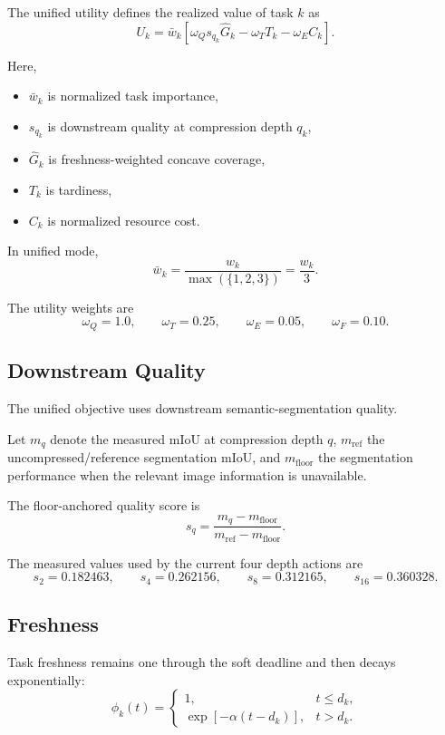 \documentclass[11pt]{article}
\begin{document}
The unified utility defines the realized value of task $k$ as
\[
U_k
=
\bar{w}_k
\left[
\omega_Qs_{q_k}\widehat{G}_k
-
\omega_TT_k
-
\omega_EC_k
\right].
\]

Here,
\begin{itemize}
    \item $\bar{w}_k$ is normalized task importance,
    \item $s_{q_k}$ is downstream quality at compression depth $q_k$,
    \item $\widehat{G}_k$ is freshness-weighted concave coverage,
    \item $T_k$ is tardiness,
    \item $C_k$ is normalized resource cost.
\end{itemize}

In unified mode,
\[
\bar{w}_k
=
\frac{w_k}{\max(\{1,2,3\})}
=
\frac{w_k}{3}.
\]

The utility weights are
\[
\omega_Q=1.0,
\qquad
\omega_T=0.25,
\qquad
\omega_E=0.05,
\qquad
\omega_F=0.10.
\]


\subsection{Downstream Quality}

The unified objective uses downstream semantic-segmentation quality.

Let $m_q$ denote the measured mIoU at compression depth $q$,
$m_{\mathrm{ref}}$ the uncompressed/reference segmentation mIoU, and
$m_{\mathrm{floor}}$ the segmentation performance when the relevant image
information is unavailable.

The floor-anchored quality score is
\[
s_q
=
\frac{m_q-m_{\mathrm{floor}}}
{m_{\mathrm{ref}}-m_{\mathrm{floor}}}.
\]

The measured values used by the current four depth actions are
\[
s_2=0.182463,
\qquad
s_4=0.262156,
\qquad
s_8=0.312165,
\qquad
s_{16}=0.360328.
\]


\subsection{Freshness}

Task freshness remains one through the soft deadline and then decays
exponentially:
\[
\phi_k(t)
=
\begin{cases}
1,
&
t\le d_k,\\[4pt]
\exp[-\alpha(t-d_k)],
&
t>d_k.
\end{cases}
\]
\end{document}
